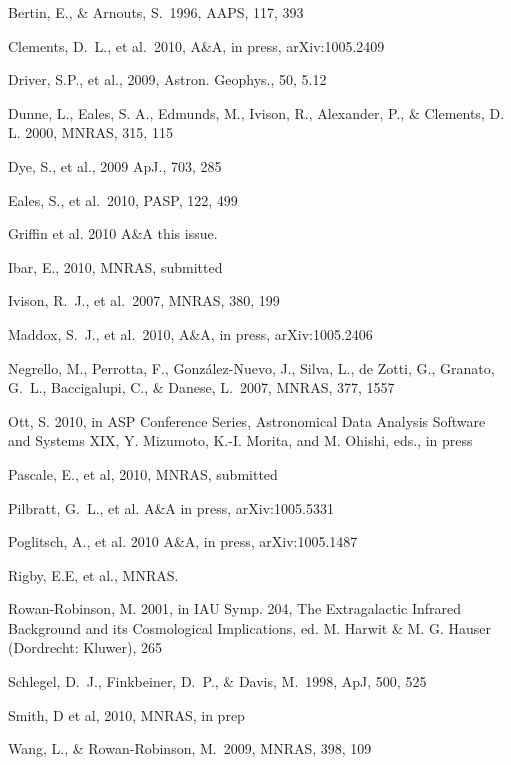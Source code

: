 \documentclass[useAMS,usenatbib]{mn2e}
\def\apj{ApJ}
\def\mnras{MNRAS}
\def\aaps{AAPS}
\def\pasp{PASP}
\begin{document}
\begin{thebibliography}{}

 Bertin, E., \& Arnouts, S.\ 1996, \aaps, 117, 393 

 Clements, D.~L., et  al.\ 2010,  A\&A, in press, arXiv:1005.2409 

Driver, S.P., et al., 2009,
  Astron. Geophys.,  50, 5.12

 Dunne, L., Eales, S. A., Edmunds,
  M., Ivison, R., Alexander, P., \& Clements, D. L. 2000, MNRAS, 315,
  115

Dye, S., et al., 2009 ApJ., 703, 285

 Eales, S., et al.\ 2010,  \pasp, 122, 499 

 Griffin et al. 2010 A\&A this issue.

 Ibar, E., 2010, MNRAS, submitted

 Ivison, R.~J., et al.\ 2007, \mnras, 380, 199 

 Maddox, S.~J., et al.\  2010,  A\&A, in press, arXiv:1005.2406 

 Negrello, M., 
Perrotta, F., Gonz{\'a}lez-Nuevo, J., Silva, L., de Zotti, G., Granato, 
G.~L., Baccigalupi, C., \& Danese, L.\ 2007, \mnras, 377, 1557 

 Ott, S. 2010, in ASP Conference Series, Astronomical Data Analysis 
Software and Systems XIX, Y. Mizumoto, K.-I. Morita, and M. Ohishi, eds., in press 

Pascale, E., et al, 2010, MNRAS, submitted

 Pilbratt, G.~L., et al. A\&A in press, arXiv:1005.5331 

 Poglitsch, A., et al. 2010 A\&A, in press, arXiv:1005.1487 

 Rigby, E.E, et al., MNRAS. 

 Rowan-Robinson, M. 2001, in IAU
  Symp. 204, The Extragalactic Infrared Background and its
  Cosmological Implications, ed. M. Harwit \& M. G.  Hauser (Dordrecht:
  Kluwer), 265


 Schlegel, D.~J., 
Finkbeiner, D.~P., \& Davis, M.\ 1998, \apj, 500, 525 

 Smith, D et al, 2010,  MNRAS, in prep

 Wang, L., \& Rowan-Robinson, M.\ 2009, \mnras, 398, 109 

\end{thebibliography}
\label{lastpage}
\end{document}
